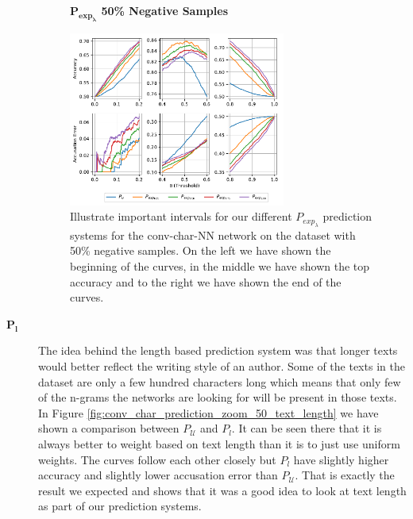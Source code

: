 \begin{description}
        \begin{figure}
            \centering
            \textbf{$\mathbf{P_{exp_\lambda}}$ 50\% Negative Samples}\par\medskip
            \includegraphics[width=0.7\textwidth]{./pictures/discussion/conv_char_nn_prediction_zoom_50_time}
            \caption{Illustrate important intervals for our different
                $P_{exp_\lambda}$ prediction systems for the \gls{conv-char-NN}
                network on the dataset with 50\% negative samples. On the left
                we have shown the beginning of the curves, in the middle we have
                shown the top accuracy and to the right we have shown the end of
                the curves.}
            \label{fig:conv_char_prediction_zoom_50}
        \end{figure}

    \item[$\mathbf{P_l}$]

        The idea behind the length based prediction system was that
        longer texts would better reflect the writing style of an
        author. Some of the texts in the dataset are only a few hundred
        characters long which means that only few of the n-grams the
        networks are looking for will be present in those texts. In Figure
        \ref{fig:conv_char_prediction_zoom_50_text_length} we have shown a
        comparison between $P_\mathcal{U}$ and $P_l$. It can be seen there that
        it is always better to weight based on text length than it is to just
        use uniform weights. The curves follow each other closely but $P_l$
        have slightly higher accuracy and slightly lower accusation error than
        $P_\mathcal{U}$. That is exactly the result we expected and shows that
        it was a good idea to look at text length as part of our prediction
        systems.


\end{description}
